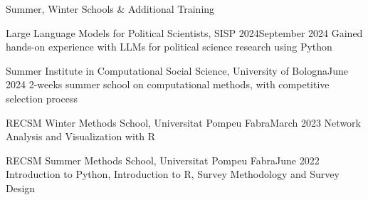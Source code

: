 \documentclass{cv} %
\begin{document}
\begin{rSection}{Summer, Winter Schools \& Additional Training}

    \begin{rTrainingSubsection}{Large Language Models for Political Scientists, SISP 2024}{September 2024}
    {Gained hands-on experience with LLMs for political science research using Python}
    \end{rTrainingSubsection}
    
    \begin{rTrainingSubsection}{Summer Institute in Computational Social Science, University of Bologna}{June 2024}
    {2-weeks summer school on computational methods, with competitive selection process}
    \end{rTrainingSubsection}
    
    \begin{rTrainingSubsection}{RECSM Winter Methods School, Universitat Pompeu Fabra}{March 2023}
    {Network Analysis and Visualization with R}
    \end{rTrainingSubsection}
    
    \begin{rTrainingSubsection}{RECSM Summer Methods School, Universitat Pompeu Fabra}{June 2022}
    {Introduction to Python, Introduction to R, Survey Methodology and Survey Design} 
    \end{rTrainingSubsection}
    
\end{rSection}
     
\end{document}
